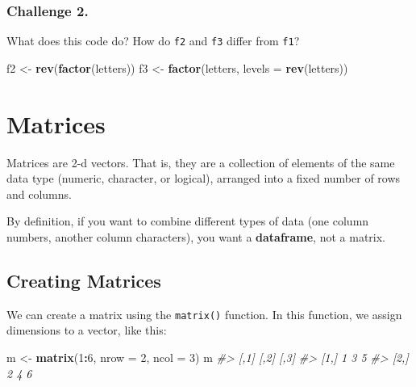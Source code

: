 \documentclass[]{book}
\newenvironment{Shaded}{\begin{snugshade}}{\end{snugshade}}
\newcommand{\CommentTok}[1]{\textcolor[rgb]{0.56,0.35,0.01}{\textit{#1}}}
\newcommand{\DataTypeTok}[1]{\textcolor[rgb]{0.13,0.29,0.53}{#1}}
\newcommand{\DecValTok}[1]{\textcolor[rgb]{0.00,0.00,0.81}{#1}}
\newcommand{\KeywordTok}[1]{\textcolor[rgb]{0.13,0.29,0.53}{\textbf{#1}}}
\newcommand{\NormalTok}[1]{#1}
\newcommand{\OperatorTok}[1]{\textcolor[rgb]{0.81,0.36,0.00}{\textbf{#1}}}
\newcommand{\StringTok}[1]{\textcolor[rgb]{0.31,0.60,0.02}{#1}}
\begin{document}
\hypertarget{challenge-2.-2}{%
\subsubsection*{Challenge 2.}\label{challenge-2.-2}}

What does this code do? How do \texttt{f2} and \texttt{f3} differ from \texttt{f1}?

\begin{Shaded}
\begin{Highlighting}[]
\NormalTok{f2 <-}\StringTok{ }\KeywordTok{rev}\NormalTok{(}\KeywordTok{factor}\NormalTok{(letters))}
\NormalTok{f3 <-}\StringTok{ }\KeywordTok{factor}\NormalTok{(letters, }\DataTypeTok{levels =} \KeywordTok{rev}\NormalTok{(letters))}
\end{Highlighting}
\end{Shaded}

\hypertarget{matrices}{%
\section{Matrices}\label{matrices}}

Matrices are 2-d vectors. That is, they are a collection of elements of the same data type (numeric, character, or logical), arranged into a fixed number of rows and columns.

By definition, if you want to combine different types of data (one column numbers, another column characters), you want a \textbf{dataframe}, not a matrix.

\hypertarget{creating-matrices}{%
\subsection{Creating Matrices}\label{creating-matrices}}

We can create a matrix using the \texttt{matrix()} function. In this function, we assign dimensions to a vector, like this:

\begin{Shaded}
\begin{Highlighting}[]
\NormalTok{m <-}\StringTok{ }\KeywordTok{matrix}\NormalTok{(}\DecValTok{1}\OperatorTok{:}\DecValTok{6}\NormalTok{, }\DataTypeTok{nrow =} \DecValTok{2}\NormalTok{, }\DataTypeTok{ncol =} \DecValTok{3}\NormalTok{)}
\NormalTok{m}
\CommentTok{#>      [,1] [,2] [,3]}
\CommentTok{#> [1,]    1    3    5}
\CommentTok{#> [2,]    2    4    6}
\end{Highlighting}
\end{Shaded}
\end{document}
